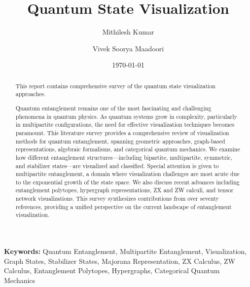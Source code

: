 \documentclass[%
 amsmath,amssymb,
 aps,
rmp,
]{revtex4-2}
\begin{document}


\title{Quantum State Visualization}%

\author{Mithilesh Kumar}
\author{Vivek Soorya Maadoori}%
%


\date{\today}%

\begin{abstract}
 This report contains comprehensive survey of the quantum state visualization approaches.

	Quantum entanglement remains one of the most fascinating and challenging phenomena in quantum physics. As quantum systems grow in complexity, particularly in multipartite configurations, the need for effective visualization techniques becomes paramount. This literature survey provides a comprehensive review of visualization methods for quantum entanglement, spanning geometric approaches, graph-based representations, algebraic formalisms, and categorical quantum mechanics. We examine how different entanglement structures---including bipartite, multipartite, symmetric, and stabilizer states---are visualized and classified. Special attention is given to multipartite entanglement, a domain where visualization challenges are most acute due to the exponential growth of the state space. We also discuss recent advances including entanglement polytopes, hypergraph representations, ZX and ZW calculi, and tensor network visualizations. This survey synthesizes contributions from over seventy references, providing a unified perspective on the current landscape of entanglement visualization. 
\end{abstract}



\maketitle
\textbf{Keywords:} Quantum Entanglement, Multipartite Entanglement, Visualization, Graph States, Stabilizer States, Majorana Representation, ZX Calculus, ZW Calculus, Entanglement Polytopes, Hypergraphs, Categorical Quantum Mechanics
\tableofcontents
\end{document}
